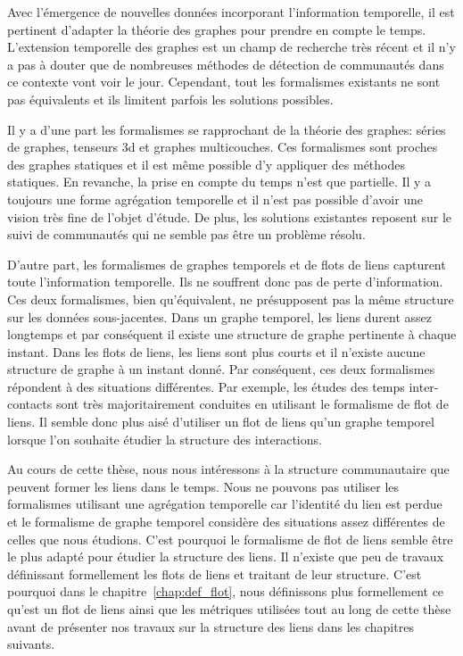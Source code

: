 Avec l'émergence de nouvelles données incorporant l'information temporelle, il est pertinent d'adapter la théorie des graphes pour prendre en compte le temps.
L'extension temporelle des graphes est un champ de recherche très récent et il n'y a pas à douter que de nombreuses méthodes de détection de communautés dans ce contexte vont voir le jour.
Cependant, tout les formalismes existants ne sont pas équivalents et ils limitent parfois les solutions possibles.


Il y a d'une part les formalismes se rapprochant de la théorie des graphes: séries de graphes, tenseurs 3d et graphes multicouches.
Ces formalismes sont proches des graphes statiques et il est même possible d'y appliquer des méthodes statiques.
En revanche, la prise en compte du temps n'est que partielle.
Il y a toujours une forme agrégation temporelle et il n'est pas possible d'avoir une vision très fine de l'objet d'étude.
De plus, les solutions existantes reposent sur le suivi de communautés qui ne semble pas être un problème résolu.


D'autre part, les formalismes de graphes temporels et de flots de liens capturent toute l'information temporelle.
Ils ne souffrent donc pas de perte d'information.
Ces deux formalismes, bien qu'équivalent, ne présupposent pas la même structure sur les données sous-jacentes.
Dans un graphe temporel, les liens durent assez longtemps et par conséquent il existe une structure de graphe pertinente à chaque instant.
Dans les flots de liens, les liens sont plus courts et il n'existe aucune structure de graphe à un instant donné.
Par conséquent, ces deux formalismes répondent à des situations différentes.
Par exemple, les études des temps inter-contacts sont très majoritairement conduites en utilisant le formalisme de flot de liens.
Il semble donc plus aisé d'utiliser un flot de liens qu'un graphe temporel lorsque l'on souhaite étudier la structure des interactions.



Au cours de cette thèse, nous nous intéressons à la structure communautaire que peuvent former les liens dans le temps.
Nous ne pouvons pas utiliser les formalismes utilisant une agrégation temporelle car l'identité du lien est perdue et le formalisme de graphe temporel considère des situations assez différentes de celles que nous étudions.
C'est pourquoi le formalisme de flot de liens semble être le plus adapté pour étudier la structure des liens.
Il n'existe que peu de travaux définissant formellement les flots de liens et traitant de leur structure.
C'est pourquoi dans le chapitre~\ref{chap:def_flot}, nous définissons plus formellement ce qu'est un flot de liens ainsi que les métriques utilisées tout au long de cette thèse avant de présenter nos travaux sur la structure des liens dans les chapitres suivants.


